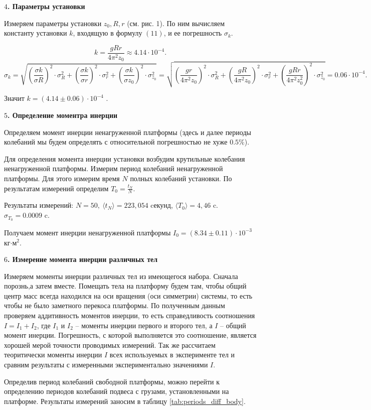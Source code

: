 \documentclass[a4paper,12pt]{article} %
\begin{document}
{\bf $4$. Параметры установки}

Измеряем параметры установки $z_0, R, r$ (см. рис. 1). По ним вычисляем константу установки $k$, входящую в формулу $(11)$, и ее погрешность $\sigma_k.$

\[ k = \frac{gRr}{4\pi^2z_0} \approx 4.14\cdot10^{-4}.\] 
$$ \sigma_k = \sqrt{(\frac{\sigma k}{\sigma R})^2\cdot\sigma_R^2 + (\frac{\sigma k}{\sigma r})^2\cdot \sigma_r^2 + (\frac{\sigma k}{\sigma z_0})^2\cdot \sigma_{z_0}^2} = \sqrt{ (\frac{gr}{4\pi^2z_0})^2\cdot \sigma_R^2 + (\frac{gR}{4\pi^2z_0})^2\cdot \sigma_r^2 +  (\frac{gRr}{4\pi^2 z_0^2})^2\cdot \sigma_{z_0}^2} = 0.06\cdot 10^{-4}.$$

Значит $k = (4.14\pm 0.06)\cdot 10^{-4}$ .

{\bf $5$. Определение моментра инерции}

Определяем момент инерции ненагруженной платформы (здесь и далее периоды колебаний мы будем определять с относительной погрешностью не хуже $0.5\%$).

Для определения момента инерции установки возбудим крутильные колебания ненагруженной платформы. Измерим период колебаний ненагруженной платформы. Для этого измерим время $N$ полных колебаний установки. По результатам измерений определим $ T_{0} = \frac{t_N}{N}$.
		
Результаты измерений: $ N = 50,\ \langle t_{N} \rangle= 223,054$ cекунд, $\langle T_{0} \rangle = 4,46$ c. $\sigma_{T_0} = 0.0009$ c.  

Получаем момент инерции ненагруженной платформы $I_0 = (8.34\pm 0.11)\cdot 10^{-3}$ кг$\cdot$м$^2$.

{\bf $6$. Измерение момента инерции различных тел}

Измеряем моменты инерции различных тел из имеющегося набора. Сначала порознь,а затем вместе. Помещать тела на платформу будем там, чтобы общий центр масс всегда находился на оси вращения (оси симметрии) системы, то есть чтобы не было заметного перекоса платформы. По полученным данным проверяем аддитивность моментов инерции, то есть справедливость соотношения $I = I_1 + I_2$, где $I_1$ и $I_2$ -- моменты инерции первого и второго тел, а $I$ -- общий момент инерции. Погрешность, с которой выполняется это соотношение, является хорошей мерой точности проводимых измерений. Так же рассчитаем теоритически моменты инерции $I$ всех используемых в эксперименте тел и сравним результаты с измеренными экспериментально значениями $I$.

Определив период колебаний свободной платформы, можно перейти к определению периодов колебаний подвеса с грузами, установленными на платформе. Результаты измерений заносим в таблицу \ref{tab:periods_diff_body}.
		
\end{document}

